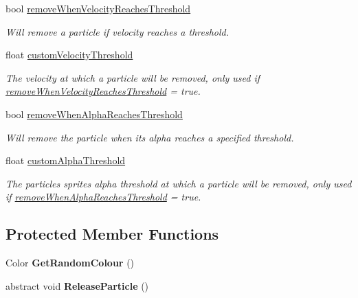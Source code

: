 \begin{DoxyCompactItemize}
bool \hyperlink{class_p_e2_d_1_1_custom_particle_emitter_ad533ffa87500059c24f4883b4258ef1c}{remove\+When\+Velocity\+Reaches\+Threshold}
\begin{DoxyCompactList}\small\item\em Will remove a particle if velocity reaches a threshold. \end{DoxyCompactList}\item 
float \hyperlink{class_p_e2_d_1_1_custom_particle_emitter_adb6bfa354cb3cad1123ea63b6d8696b5}{custom\+Velocity\+Threshold}
\begin{DoxyCompactList}\small\item\em The velocity at which a particle will be removed, only used if \hyperlink{class_p_e2_d_1_1_custom_particle_emitter_ad533ffa87500059c24f4883b4258ef1c}{remove\+When\+Velocity\+Reaches\+Threshold} = true. \end{DoxyCompactList}\item 
bool \hyperlink{class_p_e2_d_1_1_custom_particle_emitter_a2d9f43eacfbc11f6fcfb546985ca9291}{remove\+When\+Alpha\+Reaches\+Threshold}
\begin{DoxyCompactList}\small\item\em Will remove the particle when its alpha reaches a specified threshold. \end{DoxyCompactList}\item 
float \hyperlink{class_p_e2_d_1_1_custom_particle_emitter_a7bbf2eca6359446ab220db98001ca1aa}{custom\+Alpha\+Threshold}
\begin{DoxyCompactList}\small\item\em The particles sprites alpha threshold at which a particle will be removed, only used if \hyperlink{class_p_e2_d_1_1_custom_particle_emitter_a2d9f43eacfbc11f6fcfb546985ca9291}{remove\+When\+Alpha\+Reaches\+Threshold} = true. \end{DoxyCompactList}\end{DoxyCompactItemize}
\subsection*{Protected Member Functions}
\begin{DoxyCompactItemize}
\item 
\hypertarget{class_p_e2_d_1_1_custom_particle_emitter_a8acdd831f0a9826372f1364dc95bbd68}{}Color {\bfseries Get\+Random\+Colour} ()\label{class_p_e2_d_1_1_custom_particle_emitter_a8acdd831f0a9826372f1364dc95bbd68}

\item 
\hypertarget{class_p_e2_d_1_1_custom_particle_emitter_a523ecc6d970a14bf1dfe76aa1cf55060}{}abstract void {\bfseries Release\+Particle} ()\label{class_p_e2_d_1_1_custom_particle_emitter_a523ecc6d970a14bf1dfe76aa1cf55060}

\end{DoxyCompactItemize}
